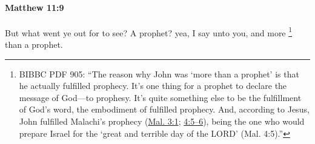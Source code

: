 			\begin{framed}
			\scriptsize
				\begin{compactdesc}
					\item[SBLG] 
				\end{compactdesc}
			\end{framed}

		\paragraph{Matthew 11:9} %
			\label{MATTHEW-11-9}

			But what went ye out for to see? A prophet? yea, I say unto you, and more%
				\footnote{%
					BIBBC PDF 905: ``The reason why John was `more than a prophet' is that he actually fulfilled prophecy. It's one thing for a prophet to declare the message of God---to prophesy. It's quite something else to be the fulfillment of God's word, the embodiment of fulfilled prophecy. And, according to Jesus, John fulfilled Malachi's prophecy (\hyperref[MALACHI-3-1]{Mal. 3:1}; \hyperref[MALACHI-4-5]{4:5--6}), being the one who would prepare Israel for the `great and terrible day of the LORD' (Mal. 4:5).''
					}
			than a prophet.

